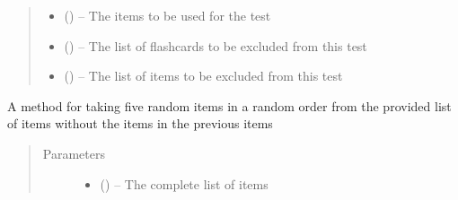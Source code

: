 \documentclass[letterpaper,10pt,english]{sphinxmanual}
\begin{document}
\begin{fulllineitems}
\begin{fulllineitems}
\begin{quote}
\begin{description}
\begin{itemize}
\item {} 
 (\href{https://docs.python.org/2/library/functions.html\#list}{}\sphinxstyleliteralemphasis{(}\sphinxstyleliteralemphasis{)}\sphinxstyleliteralemphasis{}) -- The items to be used for the test

\item {} 
 (\href{https://docs.python.org/2/library/functions.html\#list}{}\sphinxstyleliteralemphasis{)}\sphinxstyleliteralemphasis{}) -- The list of flashcards to be excluded from this test

\item {} 
 (\href{https://docs.python.org/2/library/functions.html\#list}{}\sphinxstyleliteralemphasis{)}\sphinxstyleliteralemphasis{}) -- The list of items to be excluded from this test

\end{itemize}

\end{description}\end{quote}

\end{fulllineitems}


\begin{fulllineitems}
\label{\detokenize{test:test.Test.randomise}}
A method for taking five random items in a random order from the provided list of items without the items in the previous items
\begin{quote}\begin{description}
\item[{Parameters}] \leavevmode\begin{itemize}
\item {} 
 (\href{https://docs.python.org/2/library/functions.html\#list}{}\href{https://docs.python.org/2/library/functions.html\#list}{}\sphinxstyleliteralemphasis{)}\sphinxstyleliteralemphasis{}) -- The complete list of items


\end{itemize}
\end{description}
\end{quote}
\end{fulllineitems}
\end{fulllineitems}
\end{document}

